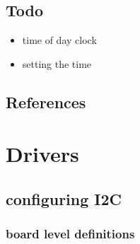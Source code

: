 \documentclass[letterpaper,10pt,english]{sphinxmanual}
\begin{document}
\section{Todo}
\label{\detokenize{RTC:todo}}\begin{itemize}
\item {} 
time of day clock

\item {} 
setting the time

\end{itemize}


\section{References}
\label{\detokenize{RTC:references}}

\chapter{Drivers}
\label{\detokenize{drivers/drivers:drivers}}\label{\detokenize{drivers/drivers:id1}}\label{\detokenize{drivers/drivers::doc}}

\section{configuring I2C}
\label{\detokenize{drivers/i2c:configuring-i2c}}\label{\detokenize{drivers/i2c::doc}}

\subsection{board level definitions}
\label{\detokenize{drivers/i2c:board-level-definitions}}
\begin{sphinxVerbatim}[commandchars=\\\{\}]
     
 
 


        

 
          
          
          
          

\end{sphinxVerbatim}
\end{document}
